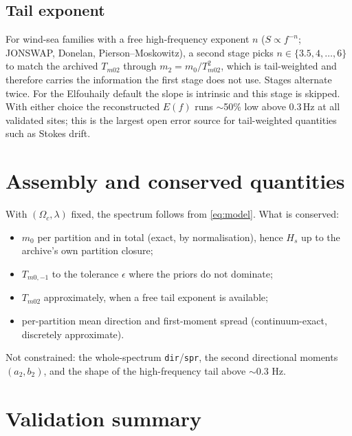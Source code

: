 \documentclass[11pt,a4paper]{article}
\newcommand{\Hs}{H_s}
\begin{document}
\subsection{Tail exponent}
\label{sec:tail}

For wind-sea families with a free high-frequency exponent $n$ ($S\propto f^{-n}$; JONSWAP, Donelan,
Pierson--Moskowitz), a second stage picks $n\in\{3.5,4,\dots,6\}$ to match the archived $T_{m02}$
through $m_2 = m_0/T_{m02}^2$, which is tail-weighted and therefore carries the information the
first stage does not use. Stages alternate twice. For the Elfouhaily default the slope is intrinsic
and this stage is skipped. With either choice the reconstructed $E(f)$ runs $\sim$50\% low above
$0.3\,$Hz at all validated sites; this is the largest open error source for tail-weighted
quantities such as Stokes drift.

\section{Assembly and conserved quantities}

With $(\Omega_c,\lambda)$ fixed, the spectrum follows from \eqref{eq:model}. What is conserved:
\begin{itemize}\itemsep2pt
\item $m_0$ per partition and in total (exact, by normalisation), hence $\Hs$ up to the archive's own
partition closure;
\item $T_{m0,-1}$ to the tolerance $\epsilon$ where the priors do not dominate;
\item $T_{m02}$ approximately, when a free tail exponent is available;
\item per-partition mean direction and first-moment spread (continuum-exact, discretely approximate).
\end{itemize}
Not constrained: the whole-spectrum \texttt{dir}/\texttt{spr}, the second directional moments
$(a_2,b_2)$, and the shape of the high-frequency tail above $\sim$0.3 Hz.

\section{Validation summary}
\end{document}
